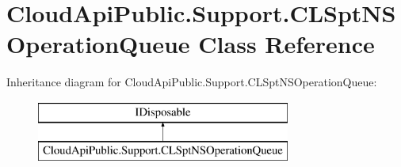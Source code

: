 \hypertarget{class_cloud_api_public_1_1_support_1_1_c_l_spt_n_s_operation_queue}{\section{Cloud\-Api\-Public.\-Support.\-C\-L\-Spt\-N\-S\-Operation\-Queue Class Reference}
\label{class_cloud_api_public_1_1_support_1_1_c_l_spt_n_s_operation_queue}
}
Inheritance diagram for Cloud\-Api\-Public.\-Support.\-C\-L\-Spt\-N\-S\-Operation\-Queue\-:\begin{figure}[H]
\begin{center}
\leavevmode
\includegraphics[height=2.000000cm]{class_cloud_api_public_1_1_support_1_1_c_l_spt_n_s_operation_queue}
\end{center}
\end{figure}
